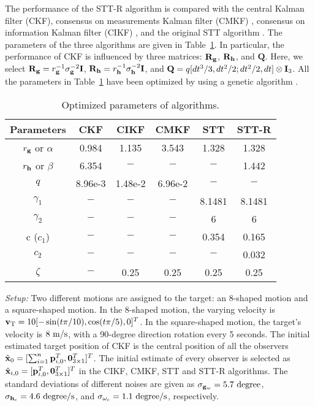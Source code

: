 \documentclass[letterpaper, 10 pt, conference]{ieeeconf}  %
\begin{document}
The performance of the STT-R algorithm is compared with the central Kalman filter (CKF), consensus on measurements Kalman filter (CMKF) \cite{olfati2009kalman}, consensus on information Kalman filter (CIKF) \cite{olfati2005consensus}, and the original STT algorithm \cite{zheng2023optimal}. The parameters of the three algorithms are given in Table~\ref{tab_params}.
In particular, the performance of CKF is influenced by three matrices: $\mathbf{R}_{\mathbf{g}}$, $\mathbf{R}_{\mathbf{h}}$, and $\mathbf{Q}$. Here, we select $\mathbf{R}_{\mathbf{g}} = r_{\mathbf{g}}^{-1}\sigma_{\mathbf{g}}^{-2}\mathbf{I}$, $\mathbf{R}_{\mathbf{h}} = r_{\mathbf{h}}^{-1}\sigma_{\mathbf{h}}^{-2}\mathbf{I}$, and $\mathbf{Q} =q[dt^3/3,dt^2/2;dt^2/2,dt]\otimes \mathbf{I}_3$. All the parameters in Table~\ref{tab_params} have been optimized by using a genetic algorithm \cite{conn1991globally}.

\begin{table}[t]
\caption{Optimized parameters of algorithms.}\label{tab_params}
\centering
\begin{tabular}{c|ccccc}
\hline
Parameters &  CKF  & CIKF & CMKF &  STT  & STT-R  \\ \hline
$r_{\mathbf{g}}$ or $\alpha$    & 0.984 & 1.135 & 3.543 & 1.328 & 1.328  \\
$r_{\mathbf{h}}$ or $\beta$ & 6.354  & $-$ & $-$ & $-$   & 1.442 \\
$q$     & 8.96e-3 & 1.48e-2  & 6.96e-2 & $-$ & $-$ \\
$\gamma_1$  & $-$ & $-$ & $-$ & 8.1481 & 8.1481\\
$\gamma_2$  & $-$ & $-$ & $-$ &  6   & 6\\
c ($c_1$)  & $-$ & $-$ & $-$ & 0.354 & 0.165 \\
$c_2$  & $-$ & $-$ & $-$ & $-$ & 0.032 \\
$\zeta$ & $-$ & 0.25 & 0.25 & 0.25 & 0.25 \\
\hline
\end{tabular}
\end{table}

\emph{Setup:}
Two different motions are assigned to the target: an 8-shaped motion and a square-shaped motion. In the 8-shaped motion, the varying velocity is $\mathbf{v}_{{\rm T}} = 10[-\sin(t\pi/10), \cos(t\pi/5), 0]^T$. In the square-shaped motion, the target's velocity is $8~{\rm m/s}$, with a 90-degree direction rotation every 5 seconds.
The initial estimated target position of CKF is the central position of all the observers $\hat{\mathbf{x}}_0=[\sum^n_{i=1}\mathbf{p}_{i, 0}^T, \mathbf{0}_{3\times1}^T]^T$. The initial estimate of every observer is selected as $\hat{\mathbf{x}}_{i, 0}=[\mathbf{p}_{i, 0}^T, \mathbf{0}_{3\times1}^T]^T$ in the CIKF, CMKF, STT and STT-R algorithms.
The standard deviations of different noises are given as $\sigma_{\mathbf{g}_w}=5.7~\text{degree}$, $\sigma_{\mathbf{h}_c}=4.6~\text{degree}/{\rm s}$, and $\sigma_{\omega_c}=1.1~\text{degree}/{\rm s}$, respectively.
\end{document}
